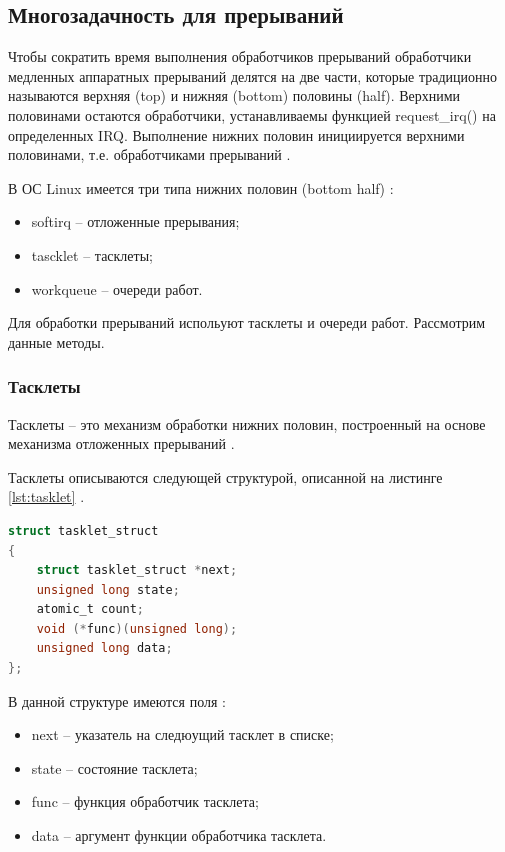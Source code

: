 \subsection{Многозадачность для прерываний}

Чтобы сократить время выполнения обработчиков прерываний обработчики медленных аппаратных прерываний делятся на две части, которые традиционно называются верхняя (top) и нижняя (bottom) половины (half). Верхними половинами остаются обработчики, устанавливаемы функцией request\_irq() на определенных IRQ. Выполнение нижних половин инициируется верхними половинами, т.е. обработчиками прерываний \cite{BottomHalf}.

В ОС Linux имеется три типа нижних половин (bottom half) \cite{BottomHalf}:

\begin{itemize}
    \item softirq -- отложенные прерывания;
    \item tascklet -- тасклеты;
    \item workqueue -- очереди работ.
\end{itemize}

Для обработки прерываний испольуют тасклеты и очереди работ. Рассмотрим данные методы.

\subsubsection{Тасклеты}

Тасклеты -- это механизм обработки нижних половин, построенный на основе механизма отложенных прерываний \cite{BottomHalf}.

Тасклеты описываются следующей структурой, описанной на листинге \ref{lst:tasklet} \cite{Tasklets}.

\begin{lstlisting}[language=c,caption=Структура tasklet,label=lst:tasklet]
struct tasklet_struct
{
    struct tasklet_struct *next;
    unsigned long state;
    atomic_t count;
    void (*func)(unsigned long);
    unsigned long data;
};
\end{lstlisting}

В данной структуре имеются поля \cite{Tasklets}:

\begin{itemize}
    \item next -- указатель на следюущий тасклет в списке;
    \item state -- состояние тасклета;
    \item func -- функция обработчик тасклета;
    \item data -- аргумент функции обработчика тасклета.
\end{itemize}

